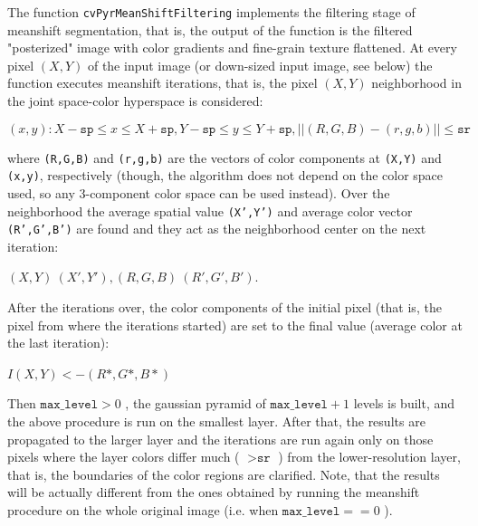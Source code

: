 \begin{description}
\end{description}

The function \texttt{cvPyrMeanShiftFiltering} implements the filtering
stage of meanshift segmentation, that is, the output of the function is
the filtered "posterized" image with color gradients and fine-grain
texture flattened. At every pixel $(X,Y)$ of the input image (or
down-sized input image, see below) the function executes meanshift
iterations, that is, the pixel $(X,Y)$ neighborhood in the joint
space-color hyperspace is considered:

\[
(x,y): X-\texttt{sp} \le x \le X+\texttt{sp} , Y-\texttt{sp} \le y \le Y+\texttt{sp} , ||(R,G,B)-(r,g,b)||  \le  \texttt{sr}
\]

where \texttt{(R,G,B)} and \texttt{(r,g,b)} are the vectors of color components at \texttt{(X,Y)} and \texttt{(x,y)}, respectively (though, the algorithm does not depend on the color space used, so any 3-component color space can be used instead). Over the neighborhood the average spatial value \texttt{(X',Y')} and average color vector \texttt{(R',G',B')} are found and they act as the neighborhood center on the next iteration: 

$(X,Y)~(X',Y'), (R,G,B)~(R',G',B').$

After the iterations over, the color components of the initial pixel (that is, the pixel from where the iterations started) are set to the final value (average color at the last iteration): 

$I(X,Y) <- (R*,G*,B*)$

Then $\texttt{max\_level}>0$ , the gaussian pyramid of
$\texttt{max\_level}+1$ levels is built, and the above procedure is run
on the smallest layer. After that, the results are propagated to the
larger layer and the iterations are run again only on those pixels where
the layer colors differ much ( $>\texttt{sr}$ ) from the lower-resolution
layer, that is, the boundaries of the color regions are clarified. Note,
that the results will be actually different from the ones obtained by
running the meanshift procedure on the whole original image (i.e. when
$\texttt{max\_level}==0$ ).

